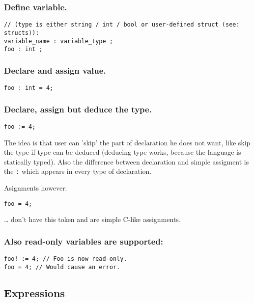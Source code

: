 \documentclass[11pt]{article}
\begin{document}
\subsubsection*{Define variable.}
\label{sec:orgd3bf51f}
\begin{verbatim}
// (type is either string / int / bool or user-defined struct (see: structs)):
variable_name : variable_type ;
foo : int ;
\end{verbatim}

\subsubsection*{Declare and assign value.}
\label{sec:org81a7b82}
\begin{verbatim}
foo : int = 4;
\end{verbatim}

\subsubsection*{Declare, assign but deduce the type.}
\label{sec:orgccefde7}
\begin{verbatim}
foo := 4;
\end{verbatim}

The idea is that user can 'skip' the part of declaration he does not want, like
skip the type if type can be deduced (deducing type works, because the language
is statically typed). Also the difference between declaration and simple
assigment is the \texttt{:} which appears in every type of declaration.

Asignments however:
\begin{verbatim}
foo = 4;
\end{verbatim}
\ldots{} don't have this token and are simple C-like assignments.

\subsubsection*{Also read-only variables are supported:}
\label{sec:org5d7f7de}
\begin{verbatim}
foo! := 4; // Foo is now read-only.
foo = 4; // Would cause an error.
\end{verbatim}


\subsection*{Expressions}
\label{sec:orgded3e28}
\end{document}
